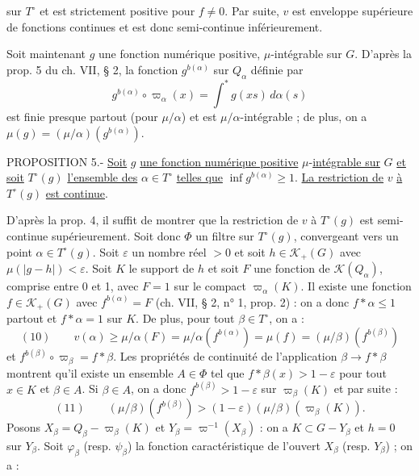 sur $T^\circ$ et est strictement positive pour $f\ne 0$. Par suite, $v$ est enveloppe supérieure de fonctions continues et est donc semi-continue inférieurement.

Soit maintenant $g$ une fonction numérique positive, $\mu$-intégrable sur $G$. D'après la prop. 5 du ch. VII, § 2, la fonction $g^{b(\alpha)}$ sur $Q_\alpha$ définie par
\[
g^{b(\alpha)}\circ\varpi_\alpha(x)=\int^*g(xs)\,d\alpha(s)
\]
est finie presque partout (pour $\mu/\alpha$) et est $\mu/\alpha$-intégrable ; de plus, on a $\mu(g)=(\mu/\alpha)(g^{b(\alpha)})$.

PROPOSITION 5.- \uline{Soit} $g$ \uline{une fonction numérique positive} $\mu$-\uline{intégrable sur} $G$ \uline{et soit} $T^\circ(g)$ \uline{l'ensemble des} $\alpha\in T^\circ$ \uline{telles que} $\inf g^{b(\alpha)}\geq 1$. \uline{La restriction de} $v$ \uline{à} $T^\circ(g)$ \uline{est continue}.

D'après la prop. 4, il suffit de montrer que la restriction de $v$ à $T^\circ(g)$ est semi-continue supérieurement. Soit donc $\Phi$ un filtre sur $T^\circ(g)$, convergeant vers un point $\alpha\in T^\circ(g)$. Soit $\varepsilon$ un nombre réel $>0$ et soit $h\in\mathcal K_+(G)$ avec $\mu(|g-h|)<\varepsilon$. Soit $K$ le support de $h$ et soit $F$ une fonction de $\mathcal K(Q_\alpha)$, comprise entre 0 et 1, avec $F=1$ sur le compact $\varpi_\alpha(K)$. Il existe une fonction $f\in\mathcal K_+(G)$ avec $f^{b(\alpha)}=F$ (ch. VII, § 2, n° 1, prop. 2) : on a donc $f*\alpha\leq 1$ partout et $f*\alpha=1$ sur $K$. De plus, pour tout $\beta\in T^\circ$, on a :
\[
(10)\qquad v(\alpha)\geq\mu/\alpha(F)=\mu/\alpha(f^{b(\alpha)})=\mu(f)=(\mu/\beta)(f^{b(\beta)})
\]
et $f^{b(\beta)}\circ\varpi_\beta=f*\beta$. Les propriétés de continuité de l'application $\beta\longrightarrow f*\beta$ montrent qu'il existe un ensemble $A\in\Phi$ tel que $f*\beta(x)>1-\varepsilon$ pour tout $x\in K$ et $\beta\in A$. Si $\beta\in A$, on a donc $f^{b(\beta)}>1-\varepsilon$ sur $\varpi_\beta(K)$ et par suite :
\[
(11)\qquad (\mu/\beta)(f^{b(\beta)})>(1-\varepsilon)(\mu/\beta)(\varpi_\beta(K)).
\]
Posons $X_\beta=Q_\beta-\varpi_\beta(K)$ et $Y_\beta=\varpi^{-1}(X_\beta)$ : on a $K\subset G-Y_\beta$ et $h=0$ sur $Y_\beta$.
Soit $\varphi_\beta$ (resp. $\psi_\beta$) la fonction caractéristique de l'ouvert $X_\beta$ (resp. $Y_\beta$) ; on a :

